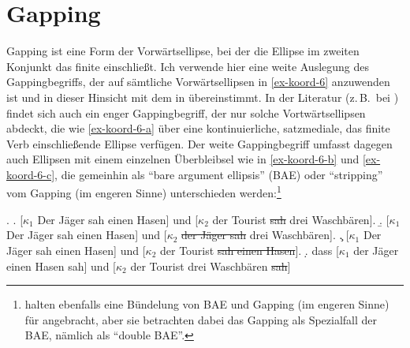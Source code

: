 \newpage
\section{Gapping}\label{sec-gapping}
\largerpage
Gapping ist eine Form der Vorwärtsellipse, bei der die Ellipse im zweiten Konjunkt das finite  einschlie\ss t. Ich verwende hier eine weite Auslegung des Gappingbegriffs, der auf sämtliche Vorwärtsellipsen in \ref{ex-koord-6} anzuwenden ist und in dieser Hinsicht mit dem in \citet[144]{Hartmann:00} übereinstimmt.  In der Literatur (z.\,B.\  bei \citealt{Ross:70,Jackendoff:71}) findet sich auch ein enger Gappingbegriff, der nur solche Vortwärtsellipsen abdeckt, die wie \ref{ex-koord-6-a} über eine kontinuierliche, satzmediale, das finite Verb einschlie\ss ende Ellipse verfügen. Der weite Gappingbegriff umfasst dagegen auch Ellipsen mit einem einzelnen Überbleibsel wie in \ref{ex-koord-6-b} und \ref{ex-koord-6-c}, die gemeinhin als "`bare argument ellipsis"' (BAE) oder "`stripping"' vom Gapping (im engeren Sinne) unterschieden werden:\footnote{\citet[275f]{Culicover:Jackendoff:05} halten ebenfalls eine Bündelung von BAE und Gapping (im engeren Sinne) für angebracht, aber sie betrachten dabei das Gapping als Spezialfall der BAE, nämlich als "`double BAE"'.}  

\ex. \label{ex-koord-6}
\a. \label{ex-koord-6-a}[$\kappa_1$ Der Jäger sah einen Hasen] und [$\kappa_2$ der Tourist \sout{sah} drei Waschbären].
\b. \label{ex-koord-6-b}[$\kappa_1$ Der Jäger sah einen Hasen] und [$\kappa_2$ \sout{der Jäger sah} drei Waschbären].
\c. \label{ex-koord-6-c}[$\kappa_1$ Der Jäger sah einen Hasen] und [$\kappa_2$ der Tourist \sout{sah einen Hasen}].
\d. \label{ex-koord-6-d} dass [$\kappa_1$ der Jäger einen Hasen sah] und [$\kappa_2$ der Tourist drei Waschbären \sout{sah}]

